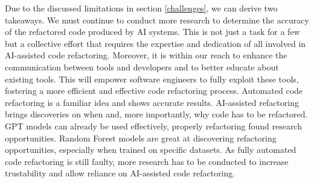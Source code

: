 Due to the discussed limitations in section \ref{challenges}, we can derive two takeaways.
We must continue to conduct more research to determine the accuracy of the refactored code produced by AI systems. This is not just a task for a few but a collective effort that requires the expertise and dedication of all involved in AI-assisted code refactoring.
Moreover, it is within our reach to enhance the communication between tools and developers and to better educate about existing tools. This will empower software engineers to fully exploit these tools, fostering a more efficient and effective code refactoring process.
Automated code refactoring is a familiar idea and shows accurate results. AI-assisted refactoring brings discoveries on when and, more importantly, why code has to be refactored. GPT models can already be used effectively, properly refactoring found research opportunities. Random Forest models are great at discovering refactoring opportunities, especially when trained on specific datasets. As fully automated code refactoring is still faulty, more research has to be conducted to increase trustability and allow reliance on AI-assisted code refactoring.